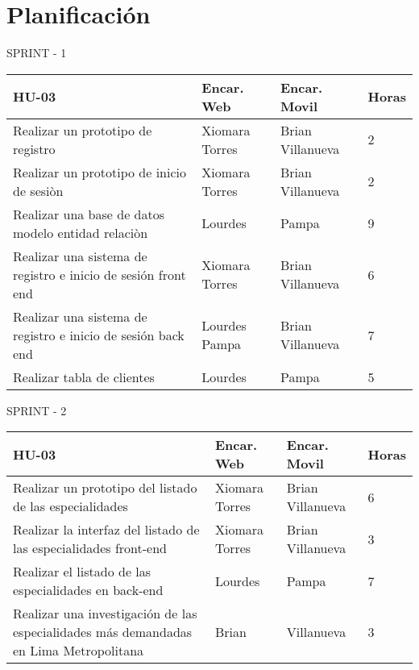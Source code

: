 \chapter{Planificación}
\centering
{SPRINT - 1}\par

\begin{tabular}{ |p{4.5 cm}|p{2 cm}|p{2 cm}|p{1.5cm}|  }
	\hline
	\rowcolor{blue!40}  \centerline {HU-03} & \centerline {Encar. Web} & \centerline {Encar. Movil} & \centerline {Horas}\\  \hline
	
	Realizar un prototipo de registro &  Xiomara Torres  &   Brian Villanueva &  \centerline 2 \\   \hline
	
	Realizar un prototipo de inicio de sesiòn &  Xiomara Torres  &  Brian Villanueva & \centerline 2   \\   \hline
	
	Realizar una base de datos modelo entidad relaciòn &  Lourdes &  Pampa & \centerline 9    \\   \hline 
	
	Realizar una sistema de registro e inicio de sesión front end  &  Xiomara Torres &  Brian Villanueva & \centerline 6    \\   \hline 
	
	Realizar una sistema de registro e inicio de sesión back end  &  Lourdes Pampa &  Brian Villanueva & \centerline 7   \\   \hline 
	
	Realizar tabla de clientes	 &  Lourdes  &  Pampa & \centerline 5   \\   \hline 
	
\end{tabular}\par

{SPRINT - 2} \par

\begin{tabular}{ |p{4.5 cm}|p{2 cm}|p{2 cm}|p{1.5cm}|  }
	\hline
	\rowcolor{blue!40}  \centerline {HU-03} & \centerline {Encar. Web} & \centerline {Encar. Movil} & \centerline {Horas}\\  \hline
	
	Realizar un prototipo del listado de las especialidades &  Xiomara Torres  &   Brian Villanueva & \centerline 6 \\   \hline
	
	Realizar la interfaz del listado de las especialidades front-end &  Xiomara Torres  &  Brian Villanueva & \centerline 3   \\   \hline
	
	Realizar el listado de las especialidades en back-end  &  Lourdes &  Pampa & \centerline 7    \\   \hline 
	
	Realizar una investigación de las especialidades más demandadas en Lima Metropolitana  &  Brian &  Villanueva & \centerline 3   \\   \hline 
	
\end{tabular}